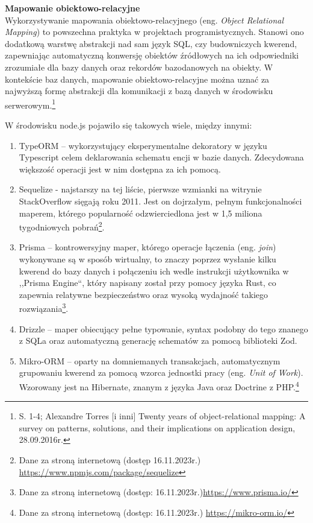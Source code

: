 \documentclass[12pt, a4paper, twoside, openany]{book}
\newcommand{\forceindent}{\leavevmode{\parindent=1.3em\indent}}
\begin{document}
\textbf{Mapowanie obiektowo-relacyjne\\}
\forceindent Wykorzystywanie mapowania obiektowo-relacyjnego (eng. \textit{Object Relational Mapping}) to powszechna praktyka w projektach programistycznych.
Stanowi ono dodatkową warstwę abstrakcji nad sam język SQL, czy budowniczych kwerend, zapewniając automatyczną konwersję obiektów źródłowych na ich odpowiedniki zrozumiałe dla bazy danych oraz rekordów bazodanowych na obiekty.
W kontekście baz danych, mapowanie obiektowo-relacyjne można uznać za najwyższą formę abstrakcji dla komunikacji z bazą danych w środowisku serwerowym.\footnote{S. 1-4; Alexandre Torres [i inni] Twenty years of object-relational mapping: A survey on patterns, solutions, and their implications on application design, 28.09.2016r.}

W środowisku node.js pojawiło się takowych wiele, między innymi:
\begin{enumerate}[label=--]
    \item TypeORM -- wykorzystujący eksperymentalne dekoratory w języku Typescript celem deklarowania schematu encji w bazie danych. Zdecydowana większość operacji jest w nim dostępna za ich pomocą.
    \item Sequelize - najstarszy na tej liście, pierwsze wzmianki na witrynie StackOverflow sięgają roku 2011. Jest on dojrzałym, pełnym funkcjonalności maperem, którego popularność odzwierciedlona jest w 1,5 miliona tygodniowych pobrań\footnote{Dane za stroną internetową (dostęp 16.11.2023r.) \url{https://www.npmjs.com/package/sequelize}}.
    \item Prisma -- kontrowersyjny maper, którego operacje łączenia (eng. \textit{join}) wykonywane są w sposób wirtualny, to znaczy poprzez wysłanie kilku kwerend do bazy danych i połączeniu ich wedle instrukcji użytkownika w ,,Prisma Engine``, który napisany został przy pomocy języka Rust, co zapewnia relatywne bezpieczeństwo oraz wysoką wydajność takiego rozwiązania\footnote{Dane za stroną internetową (dostęp: 16.11.2023r.)\url{https://www.prisma.io/}}.
    \item Drizzle -- maper obiecujący pełne typowanie, syntax podobny do tego znanego z SQLa oraz automatyczną generację schematów za pomocą biblioteki Zod.
    \item Mikro-ORM -- oparty na domniemanych transakcjach, automatycznym grupowaniu kwerend za pomocą wzorca jednostki pracy (eng. \textit{Unit of Work}). Wzorowany jest na Hibernate, znanym z języka Java oraz Doctrine z PHP.\footnote{Dane za stroną internetową (dostęp: 16.11.2023r.) \url{https://mikro-orm.io/}}
\end{enumerate}
\end{document}
